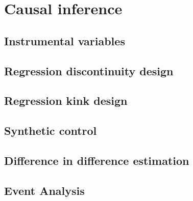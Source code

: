 \chapter{Causal inference}\label{chap12}

\section{Instrumental variables}\label{sec12_1}

\section{Regression discontinuity design}\label{sec12_2}

\section{Regression kink design}\label{sec12_3}

\section{Synthetic control}\label{sec12_4}

\section{Difference in difference estimation}\label{sec12_5}

\section{Event Analysis}\label{sec12_6}
